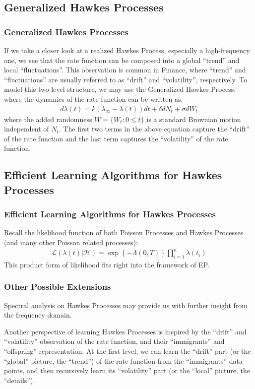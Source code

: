 \documentclass{beamer}
\newcommand{\LL}{{\mathcal L}}
\newcommand{\HH}{{\mathcal H}}
\begin{document}
\subsection{Generalized Hawkes Processes}
\begin{frame}
\frametitle{Generalized Hawkes Processes}
If we take a closer look at a realized Hawkes Process, especially a high-frequency one, we see that the rate function can be composed into a global ``trend'' and local ``fluctuations''. This observation is common in Finance, where ``trend'' and ``fluctuations'' are usually referred to as ``drift'' and ``volatility'', respectively. To model this two level structure, we may use the Generalized Hawkes Process, where the dynamics of the rate function can be written as:
\begin{align}
	d \lambda(t) = k(\lambda_{\infty}-\lambda(t)) dt + \delta dN_t + \sigma dW_t
\end{align}
where the added randomness $W = \{W_t: 0 \le t\}$ is a standard Brownian motion independent of $N_t$. The first two terms in the above equation capture the ``drift'' of the rate function and the last term captures the ``volatility'' of the rate function.
\end{frame}


\subsection{Efficient Learning Algorithms for Hawkes Processes}
\begin{frame}
\frametitle{Efficient Learning Algorithms for Hawkes Processes}
Recall the likelihood function of both Poisson Processes and Hawkes Processes (and many other Poisson related processes):
\begin{align}
  \LL(\lambda(t)|\HH) = \exp\left\{-\Lambda(0,T)\right\} \prod_{i=1}^n \lambda(t_i) \label{like}
\end{align}
This product form of likelihood fits right into the framework of EP.
\end{frame}

\begin{frame}
\frametitle{Other Possible Extensions}
Spectral analysis on Hawkes Processes may provide us with further insight from the frequency domain.

\vspace{0.1in}
Another perspective of learning Hawkes Processes is inspired by the ``drift'' and ``volatility'' observation of the rate function, and their ``immigrants'' and ``offspring'' representation. At the first level, we can learn the ``drift'' part (or the ``global'' picture, the ``trend'') of the rate function from the ``immigrants'' data points, and then recursively learn its ``volatility'' part (or the ``local'' picture, the ``details'').
\end{frame}
\end{document}
